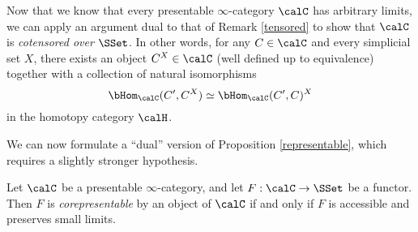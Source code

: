 \begin{remark}\label{coten}
Now that we know that every presentable $\infty$-category $\calC$ has arbitrary limits, we can apply
an argument dual to that of Remark \ref{tensored} to show that
$\calC$ is {\it cotensored over $\SSet$}. In other words, for any
$C \in \calC$ and every simplicial set $X$, there exists an object $C^X
\in \calC$ (well defined up to equivalence) together with a collection of
natural isomorphisms
$$\bHom_{\calC}(C',C^X) \simeq
\bHom_{\calC}(C',C)^{X}$$
in the homotopy category $\calH$.
\end{remark}

We can now formulate a ``dual'' version of Proposition \ref{representable}, which requires a slightly stronger hypothesis.

\begin{proposition}\label{representableprime}
Let $\calC$ be a presentable $\infty$-category, and let 
$F: \calC \rightarrow \SSet$ be a functor. Then $F$ is {\em corepresentable} by an object
of $\calC$ if and only if $F$ is accessible and preserves small limits.
\end{proposition}

